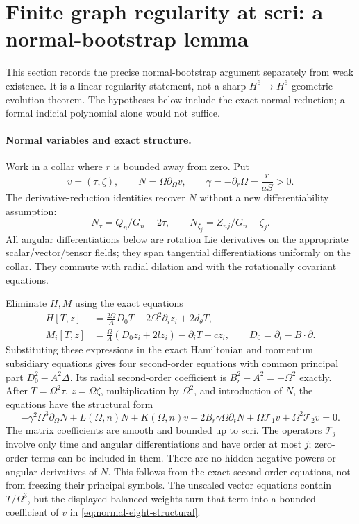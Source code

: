 \section{Finite graph regularity at scri: a normal-bootstrap lemma}
\label{sec:constraint-normal-bootstrap}

This section records the precise normal-bootstrap argument separately from
weak existence. It is a linear regularity statement, not a sharp
$H^6\longrightarrow H^6$ geometric evolution theorem. The hypotheses below
include the exact normal reduction; a formal indicial polynomial alone would
not suffice.

\paragraph{Normal variables and exact structure.}
Work in a collar where $r$ is bounded away from zero. Put
\[
 v=(\tau,\zeta),\qquad N=\Omega\partial_\Omega v,
 \qquad\gamma=-\partial_r\Omega=\frac r{aS}>0.
\]
The derivative-reduction identities recover $N$ without a new differentiability
assumption:
\[
 N_\tau=Q_n/G_n-2\tau,\qquad
 N_{\zeta_j}=Z_{nj}/G_n-\zeta_j .
\]
All angular differentiations below are rotation Lie derivatives on the
appropriate scalar/vector/tensor fields; they span tangential differentiations
uniformly on the collar. They commute with radial dilation and with the
rotationally covariant equations.

Eliminate $H,M$ using the exact equations
\begin{align}
 H[T,z]&=\frac{2\Omega}{A}D_0T-2\Omega^2\partial_i z_i
             +2d_\theta T,\\
 M_i[T,z]&=\frac\Omega A(D_0z_i+2lz_i)
             -\partial_iT-cz_i,
 \qquad D_0=\partial_t-B\cdot\partial .
\end{align}
Substituting these expressions in the exact Hamiltonian and momentum
subsidiary equations gives four second-order equations with common principal
part $D_0^2-A^2\Delta$. Its radial second-order coefficient is
$B_r^2-A^2=-\Omega^2$ exactly. After $T=\Omega^2\tau$,
$z=\Omega\zeta$, multiplication by $\Omega^2$, and introduction of $N$,
the equations have the structural form
\begin{equation}
 -\gamma^2\Omega^3\partial_\Omega N+
 L(\Omega,n)N+K(\Omega,n)v+
 2B_r\gamma\Omega\partial_tN
 +\Omega\mathcal T_1v+\Omega^2\mathcal T_2v=0 .
 \label{eq:normal-eight-structural}
\end{equation}
The matrix coefficients are smooth and bounded up to scri. The operators
$\mathcal T_j$ involve only time and angular differentiations and have order
at most $j$; zero-order terms can be included in them. There are no hidden
negative powers or angular derivatives of $N$. This follows from the exact
second-order equations, not from freezing their principal symbols. The
unscaled vector equations contain $T/\Omega^3$, but the displayed balanced
weights turn that term into a bounded coefficient of $v$ in
\eqref{eq:normal-eight-structural}.

